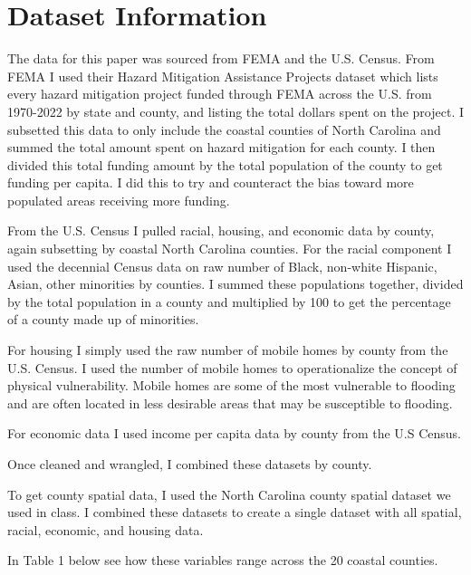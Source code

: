 \documentclass[
  12pt,
]{article}
\begin{document}
\newpage

\hypertarget{dataset-information}{%
\section{Dataset Information}\label{dataset-information}}

The data for this paper was sourced from FEMA and the U.S. Census. From
FEMA I used their Hazard Mitigation Assistance Projects dataset which
lists every hazard mitigation project funded through FEMA across the
U.S. from 1970-2022 by state and county, and listing the total dollars
spent on the project. I subsetted this data to only include the coastal
counties of North Carolina and summed the total amount spent on hazard
mitigation for each county. I then divided this total funding amount by
the total population of the county to get funding per capita. I did this
to try and counteract the bias toward more populated areas receiving
more funding.

From the U.S. Census I pulled racial, housing, and economic data by
county, again subsetting by coastal North Carolina counties. For the
racial component I used the decennial Census data on raw number of
Black, non-white Hispanic, Asian, other minorities by counties. I summed
these populations together, divided by the total population in a county
and multiplied by 100 to get the percentage of a county made up of
minorities.

For housing I simply used the raw number of mobile homes by county from
the U.S. Census. I used the number of mobile homes to operationalize the
concept of physical vulnerability. Mobile homes are some of the most
vulnerable to flooding and are often located in less desirable areas
that may be susceptible to flooding.

For economic data I used income per capita data by county from the U.S
Census.

Once cleaned and wrangled, I combined these datasets by county.

To get county spatial data, I used the North Carolina county spatial
dataset we used in class. I combined these datasets to create a single
dataset with all spatial, racial, economic, and housing data.

In Table 1 below see how these variables range across the 20 coastal
counties.
\end{document}

